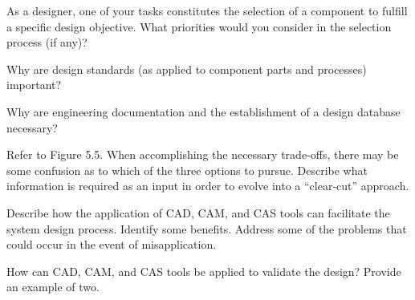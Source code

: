\begin{exercises}
    \begin{exercise}
    \label{sea-5-6}
        As a designer, one of your tasks constitutes the selection of a component to fulfill a specific design objective. What priorities would you consider in the selection process (if any)?
    \end{exercise}
    \begin{solution}
    \end{solution}
    
    \begin{exercise}
    \label{sea-5-7}
        Why are design standards (as applied to component parts and processes) important?
    \end{exercise}
    \begin{solution}
    \end{solution}
    
    \begin{exercise}
    \label{sea-5-8}
        Why are engineering documentation and the establishment of a design database necessary?
    \end{exercise}
    \begin{solution}
    \end{solution}
    
    \begin{exercise}
    \label{sea-5-9}
        Refer to Figure 5.5. When accomplishing the necessary trade-offs, there may be some confusion as to which of the three options to pursue. Describe what information is required as an input in order to evolve into a “clear-cut” approach.
    \end{exercise}
    \begin{solution}
    \end{solution}
    
    \begin{exercise}
    \label{sea-5-10}
        Describe how the application of CAD, CAM, and CAS tools can facilitate the system design process. Identify some benefits. Address some of the problems that could occur in the event of misapplication.
    \end{exercise}
    \begin{solution}
    \end{solution}
    
    \begin{exercise}
    \label{sea-5-11}
        How can CAD, CAM, and CAS tools be applied to validate the design? Provide an example of two.
    \end{exercise}
    \begin{solution}
    \end{solution}
    

\end{exercises}
